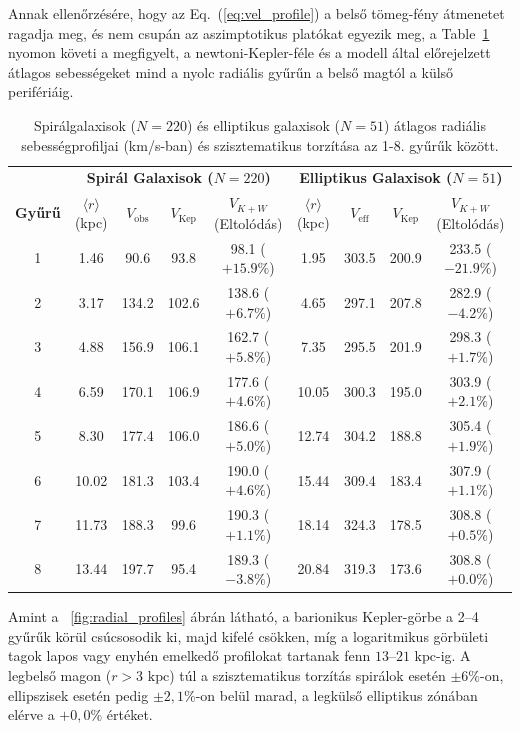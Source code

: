\documentclass[11pt,a4paper]{article}
\begin{document}
Annak ellenőrzésére, hogy az Eq.~(\ref{eq:vel_profile}) a belső tömeg-fény átmenetet ragadja meg, és nem csupán az aszimptotikus platókat egyezik meg, a Table~\ref{tab:radial_profiles} nyomon követi a megfigyelt, a newtoni-Kepler-féle és a modell által előrejelzett átlagos sebességeket mind a nyolc radiális gyűrűn a belső magtól a külső perifériáig.

\begin{table}[htbp]
	\centering
	\caption{Spirálgalaxisok ($N=220$) és elliptikus galaxisok ($N=51$) átlagos radiális sebességprofiljai (km/s-ban) és szisztematikus torzítása az 1-8. gyűrűk között.}
	\label{tab:radial_profiles}
	\small
	\begin{tabular}{c|cccc|cccc}
		\toprule
		& \multicolumn{4}{c|}{\textbf{Spirál Galaxisok ($N = 220$)}} & \multicolumn{4}{c}{\textbf{Elliptikus Galaxisok ($N = 51$)}} \\
		\textbf{Gyűrű} & $\langle r \rangle$ (kpc) & $V_{\mathrm{obs}}$ & $V_{\mathrm{Kep}}$ & $V_{K+W}$ (Eltolódás) & $\langle r \rangle$ (kpc) & $V_{\mathrm{eff}}$ & $V_{\mathrm{Kep}}$ & $V_{K+W}$ (Eltolódás) \\
		\midrule
		1 & 1.46 & 90.6 & 93.8 & 98.1 ($+15.9\%$) & 1.95 & 303.5 & 200.9 & 233.5 ($-21.9\%$) \\
		2 & 3.17 & 134.2 & 102.6 & 138.6 ($+6.7\%$) & 4.65 & 297.1 & 207.8 & 282.9 ($-4.2\%$) \\
		3 & 4.88 & 156.9 & 106.1 & 162.7 ($+5.8\%$) & 7.35 & 295.5 & 201.9 & 298.3 ($+1.7\%$) \\
		4 & 6.59 & 170.1 & 106.9 & 177.6 ($+4.6\%$) & 10.05 & 300.3 & 195.0 & 303.9 ($+2.1\%$) \\
		5 & 8.30 & 177.4 & 106.0 & 186.6 ($+5.0\%$) & 12.74 & 304.2 & 188.8 & 305.4 ($+1.9\%$) \\
		6 & 10.02 & 181.3 & 103.4 & 190.0 ($+4.6\%$) & 15.44 & 309.4 & 183.4 & 307.9 ($+1.1\%$) \\
		7 & 11.73 & 188.3 & 99.6 & 190.3 ($+1.1\%$) & 18.14 & 324.3 & 178.5 & 308.8 ($+0.5\%$) \\
		8 & 13.44 & 197.7 & 95.4 & 189.3 ($-3.8\%$) & 20.84 & 319.3 & 173.6 & 308.8 ($+0.0\%$) \\
		\bottomrule
	\end{tabular}
\end{table}

Amint a ~\ref{fig:radial_profiles} ábrán látható, a barionikus Kepler-görbe a 2--4 gyűrűk körül csúcsosodik ki, majd kifelé csökken, míg a logaritmikus görbületi tagok lapos vagy enyhén emelkedő profilokat tartanak fenn $13\text{--}21\text{ kpc}$-ig. A legbelső magon ($r > 3\text{ kpc}$) túl a szisztematikus torzítás spirálok esetén $\pm 6\%$-on, ellipszisek esetén pedig $\pm 2,1\%$-on belül marad, a legkülső elliptikus zónában elérve a $+0,0\%$ értéket.
\end{document}
